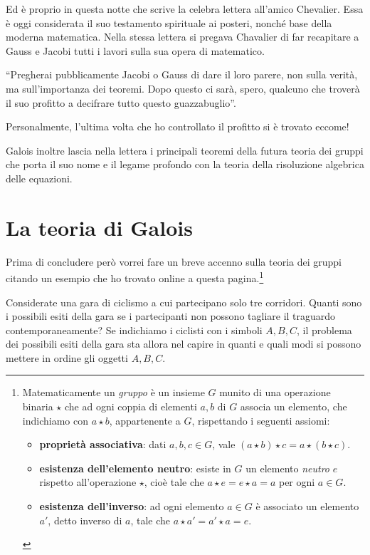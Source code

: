 Ed è proprio in questa notte che scrive la celebra lettera all’amico Chevalier. Essa è oggi considerata il suo testamento spirituale ai posteri, nonché base della moderna matematica. Nella stessa lettera si pregava Chavalier di far recapitare a Gauss e Jacobi tutti i lavori sulla sua opera di matematico.

“Pregherai pubblicamente Jacobi o Gauss di dare il loro parere, non sulla verità, ma sull’importanza dei teoremi. Dopo questo ci sarà, spero, qualcuno che troverà il suo profitto a decifrare tutto questo guazzabuglio”.

Personalmente, l’ultima volta che ho controllato il profitto si è trovato eccome!

Galois inoltre lascia nella lettera i principali teoremi della futura teoria dei gruppi che porta il suo nome e il legame profondo con la teoria della risoluzione algebrica delle equazioni.

\section{La teoria di Galois}

Prima di concludere però vorrei fare un breve accenno sulla teoria dei gruppi citando un esempio che ho trovato online a questa pagina.\footnote{Matematicamente un \emph{gruppo} è un insieme $ G $ munito di una operazione binaria $ \star $ che ad ogni coppia di elementi $ a,b $ di $ G $ associa un elemento, che indichiamo con $ a \star b $, appartenente a $ G $, rispettando i seguenti assiomi:
	\begin{itemize}
		\item \textbf{proprietà associativa}: dati $ a, b, c\in G $, vale $ (a\star b)\star c = a\star(b\star c) $.
		\item \textbf{esistenza dell'elemento neutro}: esiste in $ G $ un elemento \emph{neutro} $ e $  rispetto all'operazione $ \star $, cioè tale che $ a\star e = e\star a = a $ per ogni $ a\in G $.
		\item \textbf{esistenza dell'inverso}: ad ogni elemento $ a\in G $ è associato un elemento $ a' $, detto inverso di $ a $, tale che $ a\star a'=a'\star a=e $. 
	\end{itemize}
}

Considerate una gara di ciclismo a cui partecipano solo tre corridori. Quanti sono i possibili esiti della gara se i partecipanti non possono tagliare il traguardo contemporaneamente? Se indichiamo i ciclisti con i simboli $ A, B, C $, il problema dei possibili esiti della gara sta allora nel capire in quanti e quali modi si possono mettere in ordine gli oggetti $ A, B, C $.

